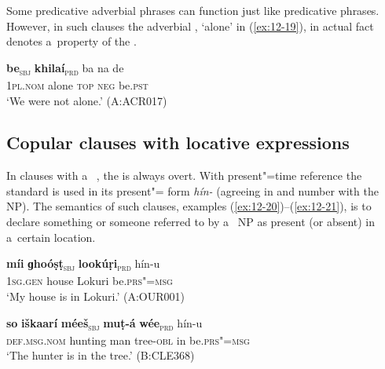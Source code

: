 Some predicative adverbial phrases can function just like predicative  phrases. However, in such clauses the adverbial , `alone' in (\ref{ex:12-19}), in actual fact denotes a~property of the .

\begin{exe}
\ex
\label{ex:12-19}
\gll {\ob}\textbf{be}{\cb}\textsubscript{\textsc{\upshape sbj}} {\ob}\textbf{khilaí}{\cb}\textsubscript{\textsc{\upshape prd}} ba na de \\
\textsc{1pl.nom} alone \textsc{top} \textsc{neg} be.\textsc{pst} \\
\glt `We were not alone.' (A:ACR017)
\end{exe}


\subsection{Copular clauses with {locative} expressions}
\label{subsec:12-1-3}

In clauses with a~  , the  is always overt. With present"=time reference the standard  is used in its present"= form \textit{hín-} (agreeing in  and number with the  NP). The semantics of such clauses, examples (\ref{ex:12-20})--(\ref{ex:12-21}), is to declare something or someone referred to by a~ NP as present (or absent) in a~certain location.

\begin{exe}
\ex
\label{ex:12-20}
\gll {\ob}\textbf{míi} \textbf{ɡhoóṣṭ}{\cb}\textsubscript{\textsc{\upshape sbj}} {\ob}\textbf{lookúṛi}{\cb}\textsubscript{\textsc{\upshape prd}} hín-u \\
\textsc{1sg.gen} house Lokuri be.\textsc{prs"=msg} \\
\glt `My house is in Lokuri.' (A:OUR001)
\end{exe}
\begin{exe}
\ex
\label{ex:12-21}
\gll {\ob}\textbf{so} \textbf{iškaarí} \textbf{méeš}{\cb}\textsubscript{\textsc{\upshape sbj}} {\ob}\textbf{muṭ-á} \textbf{wée}{\cb}\textsubscript{\textsc{\upshape prd}} hín-u \\
\textsc{def.msg.nom} hunting man tree-\textsc{obl} in be.\textsc{prs"=msg} \\
\glt `The hunter is in the tree.' (B:CLE368)
\end{exe}


